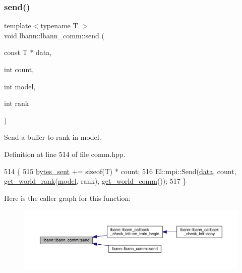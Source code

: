 \subsubsection{\texorpdfstring{send()}{send()}\hspace{0.1cm}{\footnotesize\ttfamily [1/6]}}
{\footnotesize\ttfamily template$<$typename T $>$ \\
void lbann\+::lbann\+\_\+comm\+::send (\begin{DoxyParamCaption}\item[{const T $\ast$}]{data,  }\item[{int}]{count,  }\item[{int}]{model,  }\item[{int}]{rank }\end{DoxyParamCaption})\hspace{0.3cm}{\ttfamily [inline]}}

Send a buffer to rank in model. 

Definition at line 514 of file comm.\+hpp.


\begin{DoxyCode}
514                                                            \{
515     \hyperlink{classlbann_1_1lbann__comm_ad1f146ae7337ece6266fd307944928e0}{bytes\_sent} += \textcolor{keyword}{sizeof}(T) * count;
516     El::mpi::Send(\hyperlink{namespacelbann_1_1cnpy__utils_a9ac86d96ccb1f8b4b2ea16441738781f}{data}, count, \hyperlink{classlbann_1_1lbann__comm_ab3b1ebe8b72575094405eb2e37bb447d}{get\_world\_rank}(\hyperlink{namespacelbann_adee41f31f15f3906cbdcce4a1417eb56a20f35e630daf44dbfa4c3f68f5399d8c}{model}, rank), 
      \hyperlink{classlbann_1_1lbann__comm_a0493f1f0c42b95674daacf5288fdb073}{get\_world\_comm}());
517   \}
\end{DoxyCode}
Here is the caller graph for this function\+:\nopagebreak
\begin{figure}[H]
\begin{center}
\leavevmode
\includegraphics[width=350pt]{classlbann_1_1lbann__comm_a086078b881e7250df140ac116adb1939_icgraph}
\end{center}
\end{figure}
\mbox{\label{classlbann_1_1lbann__comm_a12ddcc441fa1073aff23797c3c923ef6}} 
